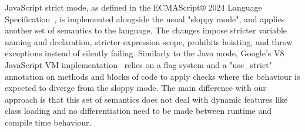 JavaScript strict mode, as defined in the ECMAScript® 2024 Language Specification~\cite{noauthor_ecmascript_nodate}, is implemented alongside the usual "sloppy mode", and applies another set of semantics to the language. The changes impose stricter variable naming and declaration, stricter expression scope, prohibits hoisting, and throw exceptions instead of silently failing. Similarly to the Java mode, Google's V8 JavaScript VM implementation~\cite{noauthor_v8_nodate} relies on a flag system and a "use\_strict" annotation on methods and blocks of code to apply checks where the behaviour is expected to diverge from the sloppy mode. The main difference with our approach is that this set of semantics does not deal with dynamic features like class loading and no differentiation need to be made between runtime and compile time behaviour. 